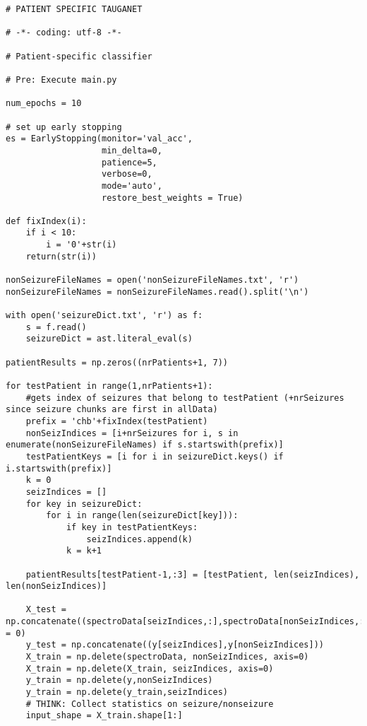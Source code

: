 \documentclass[11pt]{article}
\begin{document}
\begin{verbatim}
# PATIENT SPECIFIC TAUGANET

# -*- coding: utf-8 -*-

# Patient-specific classifier

# Pre: Execute main.py

num_epochs = 10

# set up early stopping
es = EarlyStopping(monitor='val_acc',
                   min_delta=0,
                   patience=5,
                   verbose=0,
                   mode='auto',
                   restore_best_weights = True)

def fixIndex(i):
    if i < 10:
        i = '0'+str(i)
    return(str(i))

nonSeizureFileNames = open('nonSeizureFileNames.txt', 'r')
nonSeizureFileNames = nonSeizureFileNames.read().split('\n')

with open('seizureDict.txt', 'r') as f:
    s = f.read()
    seizureDict = ast.literal_eval(s)

patientResults = np.zeros((nrPatients+1, 7))

for testPatient in range(1,nrPatients+1):
    #gets index of seizures that belong to testPatient (+nrSeizures since seizure chunks are first in allData)
    prefix = 'chb'+fixIndex(testPatient)
    nonSeizIndices = [i+nrSeizures for i, s in enumerate(nonSeizureFileNames) if s.startswith(prefix)]
    testPatientKeys = [i for i in seizureDict.keys() if i.startswith(prefix)]
    k = 0
    seizIndices = []
    for key in seizureDict:    
        for i in range(len(seizureDict[key])):
            if key in testPatientKeys:
                seizIndices.append(k)
            k = k+1

    patientResults[testPatient-1,:3] = [testPatient, len(seizIndices), len(nonSeizIndices)]
    
    X_test = np.concatenate((spectroData[seizIndices,:],spectroData[nonSeizIndices,:]),axis = 0)
    y_test = np.concatenate((y[seizIndices],y[nonSeizIndices]))
    X_train = np.delete(spectroData, nonSeizIndices, axis=0)
    X_train = np.delete(X_train, seizIndices, axis=0)
    y_train = np.delete(y,nonSeizIndices)
    y_train = np.delete(y_train,seizIndices)
    # THINK: Collect statistics on seizure/nonseizure
    input_shape = X_train.shape[1:]


\end{verbatim}
\end{document}
